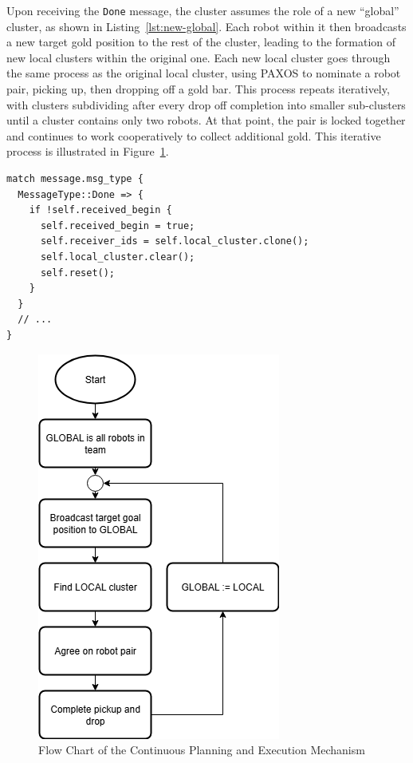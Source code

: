 \documentclass[12pt,a4paper]{article}
\begin{document}
Upon receiving the \texttt{Done} message, the cluster assumes the role of a new “global” cluster, as shown in Listing~\ref{lst:new-global}. Each robot within it then broadcasts a new target gold position to the rest of the cluster, leading to the formation of new local clusters within the original one. Each new local cluster goes through the same process as the original local cluster, using PAXOS to nominate a robot pair, picking up, then dropping off a gold bar. This process repeats iteratively, with clusters subdividing after every drop off completion into smaller sub-clusters until a cluster contains only two robots. At that point, the pair is locked together and continues to work cooperatively to collect additional gold. This iterative process is illustrated in Figure~\ref{fig:continuous-flowchart}.
 
\begin{lstlisting}[float, caption={Robot reset after receiving \texttt{Done} message}, label={lst:new-global}]
match message.msg_type {
  MessageType::Done => {
    if !self.received_begin {
      self.received_begin = true;
      self.receiver_ids = self.local_cluster.clone();
      self.local_cluster.clear();
      self.reset();
    }
  }
  // ...
}
\end{lstlisting}

\begin{figure}
    \centering
    \includegraphics[width=0.6\linewidth]{images/restart.png}
    \caption{Flow Chart of the Continuous Planning and Execution Mechanism}   
    \label{fig:continuous-flowchart}
\end{figure}
\end{document}
